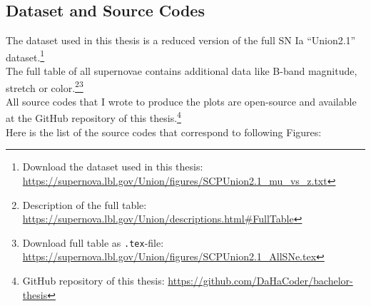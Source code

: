 \begin{appendix}

\chapter{Dataset and Source Codes}
\label{app:dataset-and-source-codes}
\thispagestyle{empty}

The dataset used in this thesis is a reduced version of the full SN Ia ``Union2.1'' dataset.\footnote{Download the dataset used in this thesis: \href{https://supernova.lbl.gov/Union/figures/SCPUnion2.1\_mu\_vs\_z.txt}{https://supernova.lbl.gov/Union/figures/SCPUnion2.1\_mu\_vs\_z.txt}} \\
The full table of all supernovae contains additional data like B-band magnitude, stretch or color.\footnote{Description of the full table: \href{https://supernova.lbl.gov/Union/descriptions.html\#FullTable}{https://supernova.lbl.gov/Union/descriptions.html\#FullTable}}\footnote{Download full table as \texttt{.tex}-file: \href{https://supernova.lbl.gov/Union/figures/SCPUnion2.1\_AllSNe.tex}{https://supernova.lbl.gov/Union/figures/SCPUnion2.1\_AllSNe.tex}} \\

\noindent All source codes that I wrote to produce the plots are open-source and available at the GitHub repository of this thesis.\footnote{GitHub repository of this thesis: \href{ https://github.com/DaHaCoder/bachelor-thesis}{https://github.com/DaHaCoder/bachelor-thesis}} \\
Here is the list of the source codes that correspond to following Figures:


\end{appendix}
